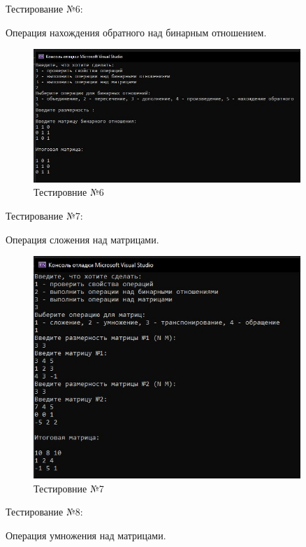 \documentclass[bachelor, och, labwork]{shiza}
\begin{document}
	Тестирование №6:

Операция нахождения обратного над бинарным отношением.


\begin{figure}[H]
	\centering
	\includegraphics[width=0.9\textwidth]{test_6}
	\caption{Тестировние №6}
	\label{fig:test_6}
\end{figure}

	Тестирование №7:

Операция сложения над матрицами.


\begin{figure}[H]
	\centering
	\includegraphics[width=0.9\textwidth]{test_7}
	\caption{Тестировние №7}
	\label{fig:test_7}
\end{figure}

	Тестирование №8:

Операция умножения над матрицами.
\end{document}
